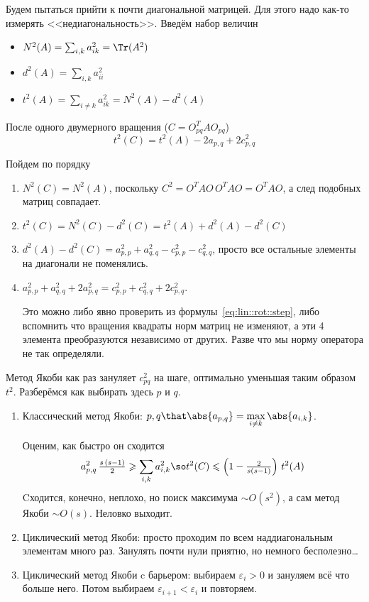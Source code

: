 \documentclass{trlnotes}
\begin{document}
Будем пытаться прийти к почти диагональной матрицей. Для этого надо
как-то измерять <<недиагональность>>.
Введём набор величин
\begin{itemize}
  \item $N^2(A) = \sum_{i,k} a_{ik}^{2} = \Tr (A^2)$
  \item $d^2(A) = \sum_{i,k} a_{ii}^{2}$
  \item $t^2(A) = \sum_{i\neq k} a_{ik}^{2} = N^2(A) - d^2(A)$
\end{itemize}

\begin{prop}\label{prop:lin::jacobi::nondiagest}
  После одного двумерного вращения ($C = O_{pq}^{T}AO_{pq}$)
  \[
    t^2(C) = t^2(A) - 2 a_{p,q} + 2 c_{p,q}^2
  \]
\end{prop}
\begin{prf}Пойдем по порядку
  \begin{enumerate}
    \item $N^2(C) = N^2(A)$, поскольку $C^2 = O^TAO\,O^TAO = O^{T}AO$, а след 
      подобных матриц совпадает.
    \item $t^2(C) = N^2(C) - d^2(C) = t^2(A) + d^2(A) - d^2(C)$
    \item $d^2(A) - d^2(C) = a_{p,p}^2 + a_{q,q}^2 - c_{p,p}^2 - c_{q,q}^2$, просто
      все остальные элементы на диагонали не поменялись.
    \item $a_{p,p}^2 + a_{q,q}^2 + 2a_{p,q}^2 = c_{p,p}^2 + c_{q,q}^2 + 2c_{p,q}^2$.

      Это можно либо явно проверить из формулы~\eqref{eq:lin::rot::step}, либо
      вспомнить что вращения квадраты норм матриц не изменяют, а эти 4 элемента
      преобразуются независимо от других. Разве что мы норму оператора не так 
      определяли.
  \end{enumerate}
\end{prf}
Метод Якоби как раз зануляет $c_{pq}^2$ на шаге, оптимально уменьшая таким образом
$t^2$.
Разберёмся как выбирать здесь $p$ и $q$. 

\begin{enumerate}
  \item Классический метод Якоби: 
    $p,q\that \abs{a_{p,q}} = \max\limits_{i\neq k}\abs{a_{i,k}}$.
    
    Оценим, как быстро он сходится
    \[
      a_{p,q}^2\, \tfrac{s\,(s-1)}2 \geqslant \sum_{i,k} a_{i,k}^2 \so
      t^2(C) \leqslant \left(1 - \tfrac{2}{s(s-1)}\right)\, t^2(A) 
    \]
    Cходится, конечно, неплохо, но поиск максимума $\sim O(s^2)$, а сам метод
    Якоби $\sim O(s)$. Неловко выходит.
  \item Циклический метод Якоби: просто проходим по всем наддиагональным
    элементам много раз. Занулять почти нули приятно, но немного бесполезно\dots
  \item Циклический метод Якоби c барьером: выбираем $ε_i > 0$ и зануляем всё
    что больше него. Потом выбираем $ε_{i+1} < ε_{i}$ и повторяем.
\end{enumerate}
\end{document}
